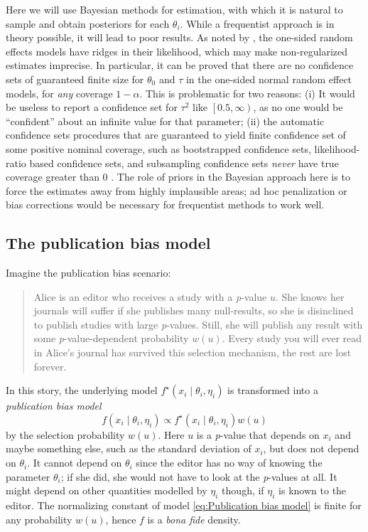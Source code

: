 \documentclass{article}
\theoremstyle{plain}
\theoremstyle{definition}
\begin{document}
Here we will use Bayesian methods for estimation, with which it is natural to sample and obtain posteriors for each $\theta_{i}$. While a frequentist approach is in theory possible, it will lead to poor results. As noted by \citet[Appendix, 1]{mcshane2016adjusting}, the one-sided random effects models have ridges in their likelihood, which may make non-regularized estimates imprecise. In particular, it can be proved \citep{Moss2019} that there are no confidence sets of guaranteed finite size for $\theta_{0}$ and $\tau$ in the one-sided normal random effect models, for \emph{any} coverage $1-\alpha$. This is problematic for two reasons: (i) It would be useless to report a confidence set for $\tau^{2}$ like $\left[0.5,\infty\right)$, as no one would be ``confident'' about an infinite value for that parameter; (ii) the automatic confidence sets procedures that are guaranteed to yield finite confidence set of some positive nominal coverage, such as bootstrapped confidence sets, likelihood-ratio based confidence sets, and subsampling confidence sets \emph{never} have true coverage greater than $0$ \citep[see][]{gleser996bootstrap, Moss2019}. The role of priors in the Bayesian approach here is to force the estimates away from highly implausible areas; ad hoc penalization or bias corrections would be necessary for frequentist methods to work well.

\subsection{The publication bias model} \label{subsect:publicationBias}

Imagine the publication bias scenario:
\begin{quote}
Alice is an editor who receives a study with a \textit{p}-value $u$. She knows her journals will suffer if she publishes many null-results, so she is disinclined to publish studies with large \textit{p}-values. Still, she will publish any result with some \textit{p}-value-dependent probability $w\left(u\right)$. Every study you will ever read in Alice's journal has survived this selection mechanism, the rest are lost forever.
\end{quote}
In this story, the underlying model $f^{\star}\left(x_{i}\mid\theta_{i},\eta_{i}\right)$
is transformed into a \emph{publication bias model}
\begin{equation}
f\left(x_{i}\mid\theta_{i},\eta_{i}\right)\propto f^{\star}\left(x_{i}\mid\theta_{i},\eta_{i}\right)w\left(u\right)\label{eq:Publication bias model}
\end{equation}
by the selection probability $w\left(u\right)$. Here $u$ is a \textit{p}-value that depends on $x_{i}$ and maybe something else, such as the standard deviation of $x_{i}$, but does not depend on $\theta_{i}$. It cannot depend on $\theta_{i}$ since the editor has no way of knowing the parameter $\theta_{i}$; if she did, she would not have to look at the \textit{p}-values at all. It might depend on other quantities modelled by $\eta_{i}$ though, if $\eta_{i}$ is known to the editor. The normalizing constant of model \eqref{eq:Publication bias model} is finite for any probability $w(u)$, hence $f$ is a \emph{bona fide} density.
\end{document}
